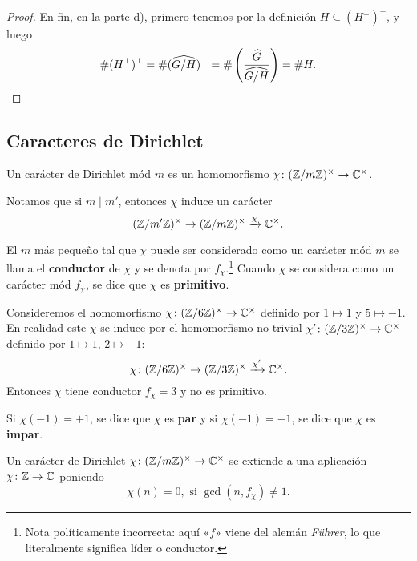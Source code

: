 \begin{proposicion}
\begin{proof}
    En fin, en la parte d), primero tenemos por la definición
    $H \subseteq (H^\perp)^\perp$, y luego
    \[ \# (H^\perp)^\perp = \# (\widehat{G/H})^\perp =
       \# \left(\frac{\widehat{G}}{\widehat{G/H}}\right) = \# H. \qedhere \]
  \end{proof}
\end{proposicion}

\subsection{Caracteres de Dirichlet}

\begin{definicion}
  Un carácter de Dirichlet mód $m$ es un homomorfismo
  $\chi\colon (\mathbb{Z}/m\mathbb{Z})^\times \to \mathbb{C}^\times$.
\end{definicion}

Notamos que si $m \mid m'$, entonces $\chi$ induce un carácter
\[ (\mathbb{Z}/m'\mathbb{Z})^\times \to (\mathbb{Z}/m\mathbb{Z})^\times \xrightarrow{\chi} \mathbb{C}^\times. \]

\begin{definicion}
  El $m$ más pequeño tal que $\chi$ puede ser considerado como un carácter mód
  $m$ se llama el \textbf{conductor} de $\chi$ y se denota por
  $f_\chi$.\footnote{Nota políticamente incorrecta: aquí «$f$» viene del alemán
    \emph{Führer}, lo que literalmente significa líder o conductor.}  Cuando
  $\chi$ se considera como un carácter mód $f_\chi$, se dice que $\chi$ es
  \textbf{primitivo}.
\end{definicion}

\begin{ejemplo}
  Consideremos el homomorfismo $\chi\colon (\mathbb{Z}/6\mathbb{Z})^\times \to \mathbb{C}^\times$
  definido por $1 \mapsto 1$ y $5 \mapsto -1$. En realidad este $\chi$ se induce
  por el homomorfismo no trivial $\chi'\colon (\mathbb{Z}/3\mathbb{Z})^\times \to \mathbb{C}^\times$
  definido por $1 \mapsto 1$, $2 \mapsto -1$:
  $$\chi\colon (\mathbb{Z}/6\mathbb{Z})^\times \to (\mathbb{Z}/3\mathbb{Z})^\times \xrightarrow{\chi'} \mathbb{C}^\times.$$
  Entonces $\chi$ tiene conductor $f_\chi = 3$ y no es primitivo.
\end{ejemplo}

\begin{definicion}
  Si $\chi (-1) = +1$, se dice que $\chi$ es \textbf{par} y si
  $\chi (-1) = -1$, se dice que $\chi$ es \textbf{impar}.
\end{definicion}

Un carácter de Dirichlet $\chi\colon (\mathbb{Z}/m\mathbb{Z})^\times \to \mathbb{C}^\times$ se extiende
a una aplicación $\chi\colon \mathbb{Z}\to \mathbb{C}$ poniendo
$$\chi (n) = 0, \text{ si }\gcd (n,f_\chi) \ne 1.$$

